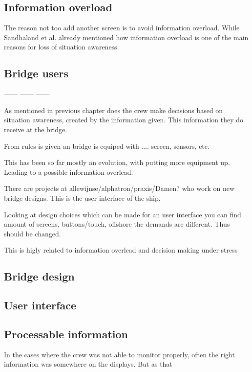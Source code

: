 
\subsection{Information overload}
The reason not too add another screen is to avoid information overload. While Sandhaland et al. already mentioned how information overload is one of the main reasons for loss of situation awareness. 

\subsection{Bridge users}
------ ------ ------

As mentioned in previous chapter does the crew make decisions based on situation awareness, created by the information given. This information they do receive at the bridge.

From rules is given an bridge is equiped with .... screen, sensors, etc.

This has been so far mostly an evolution, with putting more equipment up. Leading to a possible information overlead. 

There are projects at allewijnse/alphatron/praxis/Damen? who work on new bridge designs. This is the user interface of the ship.

Looking at design choices which can be made for an user interface you can find amount of screens, buttons/touch, offshore the demands are different. Thus should be changed. 

This is higly related to information overlead and decision making under stress

\subsection{Bridge design}

\subsection{User interface}

\subsection{Processable information}
In the cases where the crew was not able to monitor properly, often the right information was somewhere on the displays. But as that 


